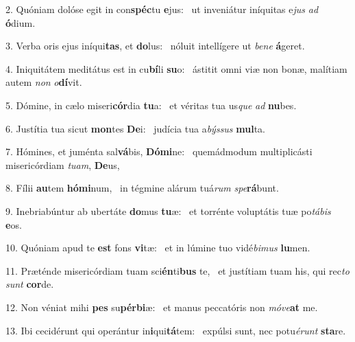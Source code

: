 2. Quóniam dolóse egit in con\textbf{spéc}tu \textbf{e}jus: \ast\  ut inveniátur iníquitas e\textit{jus} \textit{ad} \textbf{ó}dium.\

3. Verba oris ejus iníqui\textbf{tas}, et \textbf{do}lus: \ast\  nóluit intellígere ut \textit{be}\textit{ne} \textbf{á}geret.\

4. Iniquitátem meditátus est in cu\textbf{bí}li \textbf{su}o: \ast\  ástitit omni viæ non bonæ, malítiam autem \textit{non} \textit{o}\textbf{dí}vit.\

5. Dómine, in cælo miseri\textbf{cór}dia \textbf{tu}a: \ast\  et véritas tua us\textit{que} \textit{ad} \textbf{nu}bes.\

6. Justítia tua sicut \textbf{mon}tes \textbf{De}i: \ast\  judícia tua a\textit{býs}\textit{sus} \textbf{mul}ta.\

7. Hómines, et juménta sal\textbf{vá}bis, \textbf{Dó}\textbf{mi}ne: \ast\  quemádmodum multiplicásti misericórdiam \textit{tu}\textit{am}, \textbf{De}us,\

8. Fílii \textbf{au}tem \textbf{hó}\textbf{mi}num, \ast\  in tégmine alárum tuá\textit{rum} \textit{spe}\textbf{rá}bunt.\

9. Inebriabúntur ab ubertáte \textbf{do}mus \textbf{tu}æ: \ast\  et torrénte voluptátis tuæ po\textit{tá}\textit{bis} \textbf{e}os.\

10. Quóniam apud te \textbf{est} fons \textbf{vi}tæ: \ast\  et in lúmine tuo vidé\textit{bi}\textit{mus} \textbf{lu}men.\

11. Præténde misericórdiam tuam sci\textbf{én}ti\textbf{bus} te, \ast\  et justítiam tuam his, qui rec\textit{to} \textit{sunt} \textbf{cor}de.\

12. Non véniat mihi \textbf{pes} su\textbf{pér}\textbf{bi}æ: \ast\  et manus peccatóris non \textit{mó}\textit{ve}\textbf{at} me.\

13. Ibi cecidérunt qui operántur in\textbf{i}qui\textbf{tá}tem: \ast\  expúlsi sunt, nec potu\textit{é}\textit{runt} \textbf{sta}re.\

